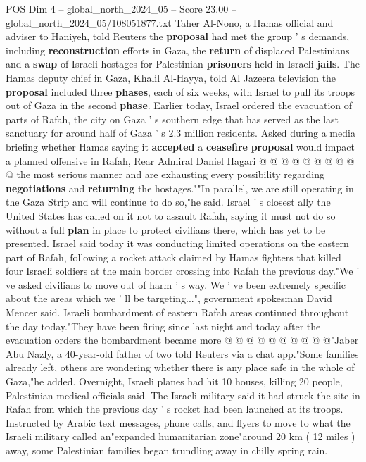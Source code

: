 \begin{textsample}{POS Dim 4 – global\_north\_2024\_05 – Score 23.00 – global\_north\_2024\_05/108051877.txt}
Taher Al-Nono, a Hamas official and adviser to Haniyeh, told Reuters the \textbf{proposal} had met the group ' s demands, including \textbf{reconstruction} efforts in Gaza, the \textbf{return} of displaced Palestinians and a \textbf{swap} of Israeli hostages for Palestinian \textbf{prisoners} held in Israeli \textbf{jails}.
The Hamas deputy chief in Gaza, Khalil Al-Hayya, told Al Jazeera television the \textbf{proposal} included three \textbf{phases}, each of six weeks, with Israel to pull its troops out of Gaza in the second \textbf{phase}.
Earlier today, Israel ordered the evacuation of parts of Rafah, the city on Gaza ' s southern edge that has served as the last sanctuary for around half of Gaza ' s 2.3 million residents.
Asked during a media briefing whether Hamas saying it \textbf{accepted} a \textbf{ceasefire} \textbf{proposal} would impact a planned offensive in Rafah, Rear Admiral Daniel Hagari @ @ @ @ @ @ @ @ @ @ the most serious manner and are exhausting every possibility regarding \textbf{negotiations} and \textbf{returning} the hostages.""In parallel, we are still operating in the Gaza Strip and will continue to do so,"he said.
Israel ' s closest ally the United States has called on it not to assault Rafah, saying it must not do so without a full \textbf{plan} in place to protect civilians there, which has yet to be presented.
Israel said today it was conducting limited operations on the eastern part of Rafah, following a rocket attack claimed by Hamas fighters that killed four Israeli soldiers at the main border crossing into Rafah the previous day."We ' ve asked civilians to move out of harm ' s way.
We ' ve been extremely specific about the areas which we ' ll be targeting...", government spokesman David Mencer said.
Israeli bombardment of eastern Rafah areas continued throughout the day today."They have been firing since last night and today after the evacuation orders the bombardment became more @ @ @ @ @ @ @ @ @ @"Jaber Abu Nazly, a 40-year-old father of two told Reuters via a chat app."Some families already left, others are wondering whether there is any place safe in the whole of Gaza,"he added.
Overnight, Israeli planes had hit 10 houses, killing 20 people, Palestinian medical officials said.
The Israeli military said it had struck the site in Rafah from which the previous day ' s rocket had been launched at its troops.
Instructed by Arabic text messages, phone calls, and flyers to move to what the Israeli military called an"expanded humanitarian zone"around 20 km ( 12 miles ) away, some Palestinian families began trundling away in chilly spring rain.

\end{textsample}
